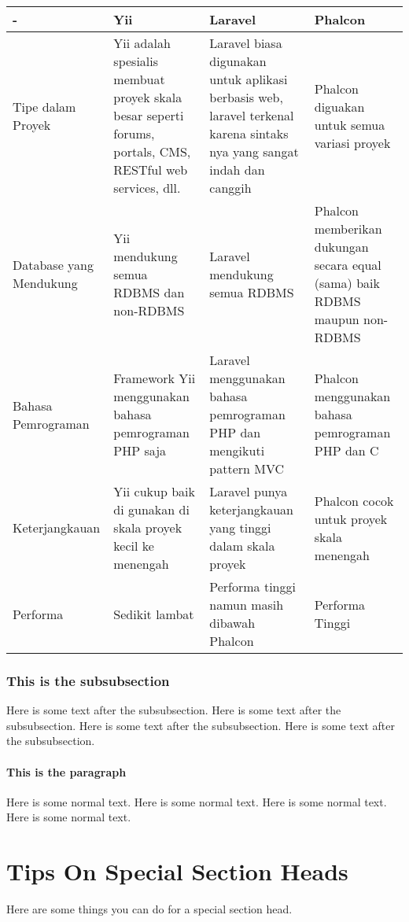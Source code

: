 \begin{center}
 \begin{tabular}{ | m{2em} | m{3cm}| m{3cm} | m{3cm} }
 \hline
 - & Yii & Laravel & Phalcon \\ [0.5ex]
 \hline\hline
 Tipe dalam Proyek & Yii adalah spesialis membuat proyek skala besar seperti forums, portals, CMS, RESTful web services, dll. & Laravel biasa digunakan untuk aplikasi berbasis web, laravel terkenal karena sintaks nya yang sangat indah dan canggih & Phalcon diguakan untuk semua variasi proyek \\
 \hline
 Database yang Mendukung & Yii mendukung semua RDBMS dan non-RDBMS & Laravel mendukung semua RDBMS & Phalcon memberikan dukungan secara equal (sama) baik RDBMS maupun non-RDBMS \\
 \hline
 Bahasa Pemrograman & Framework Yii menggunakan bahasa pemrograman PHP saja & Laravel menggunakan bahasa pemrograman PHP dan mengikuti pattern MVC & Phalcon menggunakan bahasa pemrograman PHP dan C \\
 \hline
 Keterjangkauan & Yii cukup baik di gunakan di skala proyek kecil ke menengah & Laravel punya keterjangkauan yang tinggi dalam skala proyek & Phalcon cocok untuk proyek skala menengah \\
 \hline
 Performa & Sedikit lambat & Performa tinggi namun masih dibawah Phalcon & Performa Tinggi \\ [1ex]
 \hline
\end{tabular}
\end{center}


\subsubsection{This is the subsubsection}
Here is some text after the subsubsection.
Here is some text after the subsubsection.
Here is some text after the subsubsection.
Here is some text after the subsubsection.

\paragraph{This is the paragraph}
Here is some normal text.
Here is some normal text.
Here is some normal text.
Here is some normal text.

\section{Tips On Special Section Heads}
Here are some things you can do for a special
section head.

